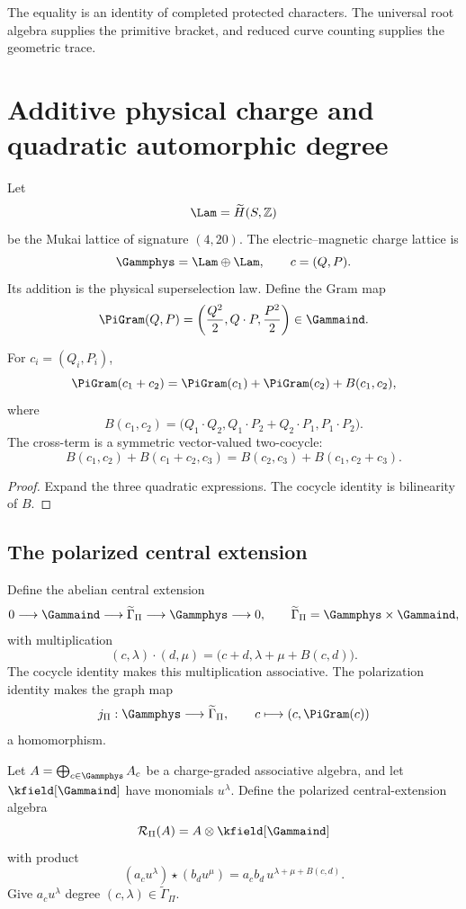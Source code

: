 The equality is an identity of completed protected characters.  The universal root algebra supplies the primitive bracket, and reduced curve counting supplies the geometric trace.

\chapter{Additive physical charge and quadratic automorphic degree}
Let
\[
 \Lam=\widetilde H(S,\Z)
\]
be the Mukai lattice of signature $(4,20)$. The electric--magnetic charge lattice is
\[
 \Gammphys=\Lam\oplus\Lam,
 \qquad c=(Q,P).
\]
Its addition is the physical superselection law. Define the Gram map
\[
 \PiGram(Q,P)=
 \left(\frac{Q^2}{2},Q\cdot P,\frac{P^2}{2}\right)
 \in\Gammaind.
\]

\begin{proposition}
For $c_i=(Q_i,P_i)$,
\[
 \PiGram(c_1+c_2)=\PiGram(c_1)+\PiGram(c_2)+B(c_1,c_2),
\]
where
\[
 B(c_1,c_2)=
 \bigl(Q_1\cdot Q_2,
 Q_1\cdot P_2+Q_2\cdot P_1,
 P_1\cdot P_2\bigr).
\]
The cross-term is a symmetric vector-valued two-cocycle:
\[
 B(c_1,c_2)+B(c_1+c_2,c_3)
 =B(c_2,c_3)+B(c_1,c_2+c_3).
\]
\end{proposition}
\begin{proof}
Expand the three quadratic expressions. The cocycle identity is bilinearity of $B$.
\end{proof}

\section{The polarized central extension}
Define the abelian central extension
\[
 0\longrightarrow\Gammaind\longrightarrow
 \widetilde\Gamma_\Pi
 \longrightarrow\Gammphys\longrightarrow0,
 \qquad
 \widetilde\Gamma_\Pi=\Gammphys\times\Gammaind,
\]
with multiplication
\[
 (c,\lambda)\cdot(d,\mu)
 =\bigl(c+d,\lambda+\mu+B(c,d)\bigr).
\]
The cocycle identity makes this multiplication associative. The polarization identity makes the graph map
\[
 j_\Pi:\Gammphys\longrightarrow\widetilde\Gamma_\Pi,
 \qquad c\longmapsto(c,\PiGram(c))
\]
a homomorphism.

Let $A=\bigoplus_{c\in\Gammphys}A_c$ be a charge-graded associative algebra, and let $\kfield[\Gammaind]$ have monomials $u^\lambda$. Define the polarized central-extension algebra
\[
 \mathcal R_\Pi(A)=A\tensor\kfield[\Gammaind]
\]
with product
\[
 (a_cu^\lambda)\star(b_du^\mu)
 =a_cb_d\,u^{\lambda+\mu+B(c,d)}.
\]
Give $a_cu^\lambda$ degree $(c,\lambda)\in\widetilde\Gamma_\Pi$.

